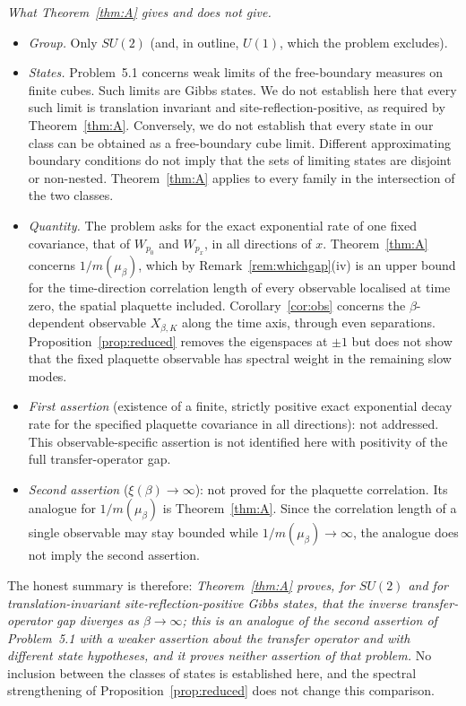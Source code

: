 \documentclass[11pt,a4paper]{article}
\theoremstyle{plain}
\theoremstyle{definition}
\theoremstyle{remark}
\numberwithin{equation}{section}
\begin{document}
\emph{What Theorem~\ref{thm:A} gives and does not give.}
\begin{itemize}
\item \emph{Group.} Only $SU(2)$ (and, in outline, $U(1)$, which the problem excludes).
\item \emph{States.} Problem~5.1 concerns weak limits of the free-boundary measures on finite cubes. Such limits are Gibbs states.
We do not establish here that every such limit is translation invariant and site-reflection-positive, as required by
Theorem~\ref{thm:A}. Conversely, we do not establish that every state in our class can be obtained as a free-boundary cube limit.
Different approximating boundary conditions do not imply that the sets of limiting states are disjoint or non-nested.
Theorem~\ref{thm:A} applies to every family in the intersection of the two classes.
\item \emph{Quantity.} The problem asks for the exact exponential rate of one fixed covariance, that of $W_{p_0}$ and $W_{p_x}$, in all
directions of $x$. Theorem~\ref{thm:A} concerns $1/m(\mu_\beta)$, which by Remark~\ref{rem:whichgap}(iv) is an upper bound for the
time-direction correlation length of every observable localised at time zero, the spatial plaquette included. Corollary~\ref{cor:obs}
concerns the $\beta$-dependent observable $X_{\beta,K}$ along the time axis, through even separations.
Proposition~\ref{prop:reduced} removes the eigenspaces at $\pm1$ but does not show that the fixed plaquette observable has spectral
weight in the remaining slow modes.
\item \emph{First assertion} (existence of a finite, strictly positive exact exponential decay rate for the specified plaquette
covariance in all directions): not addressed. This observable-specific assertion is not identified here with positivity of the full
transfer-operator gap.
\item \emph{Second assertion} ($\xi(\beta)\to\infty$): not proved for the plaquette correlation. Its analogue for $1/m(\mu_\beta)$ is
Theorem~\ref{thm:A}. Since the correlation length of a single observable may stay bounded while $1/m(\mu_\beta)\to\infty$, the analogue
does not imply the second assertion.
\end{itemize}
The honest summary is therefore: \emph{Theorem~\ref{thm:A} proves, for $SU(2)$ and for translation-invariant site-reflection-positive
Gibbs states, that the inverse transfer-operator gap diverges as $\beta\to\infty$; this is an analogue of the second assertion of
Problem~5.1 with a weaker assertion about the transfer operator and with different state hypotheses, and it proves neither assertion
of that problem.} No inclusion between the classes of states is established here, and the spectral strengthening of
Proposition~\ref{prop:reduced} does not change this comparison.
\end{document}
